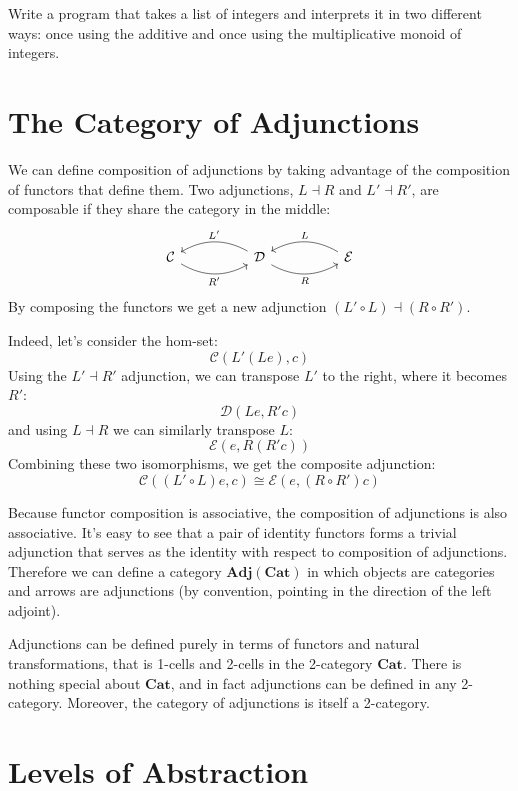 \documentclass[DaoFP]{subfiles}
\begin{document}
\begin{exercise}
Write a program that takes a list of integers and interprets it in two different ways: once using the additive and once using the multiplicative monoid of integers.
\end{exercise}

\section{The Category of Adjunctions}
We can define composition of adjunctions by taking advantage of the composition of functors that define them. Two adjunctions, $L \dashv R$ and $L' \dashv R'$, are composable if they share the category in the middle:
\[
 \begin{tikzcd}
  \mathcal{C}
  \arrow[rr, bend right, "R'"']
  &&
  \mathcal{D}
  \arrow[ll, bend right, "L'"']
    \arrow[rr, bend right, "R"']
&&
  \mathcal{E}
  \arrow[ll, bend right, "L"']
 \end{tikzcd}
\]
By composing the functors we get a new adjunction $(L' \circ L) \dashv (R \circ R')$. 

Indeed, let's consider the hom-set:
\[ \mathcal{C}(L' (L e), c) \]
Using the $L' \dashv R'$ adjunction, we can transpose $L'$ to the right, where it becomes $R'$:
\[ \mathcal{D}(L e, R' c) \]
and using $L \dashv R$ we can similarly transpose $L$:
\[ \mathcal{E}( e, R(R' c)) \]
Combining these two isomorphisms, we get the composite adjunction:
\[ \mathcal{C}((L' \circ L) e, c) \cong \mathcal{E}( e, (R \circ R') c)\]

Because functor composition is associative, the composition of adjunctions is also associative. It's easy to see that a pair of identity functors forms a trivial adjunction that serves as the identity with respect to composition of adjunctions. Therefore we can define a category $\mathbf{Adj}(\mathbf{Cat})$ in which objects are categories and arrows are adjunctions (by convention, pointing in the direction of the left adjoint). 

Adjunctions can be defined purely in terms of functors and natural transformations, that is 1-cells and 2-cells in the 2-category $\mathbf{Cat}$. There is nothing special about $\mathbf{Cat}$, and in fact adjunctions can be defined in any 2-category. Moreover, the category of adjunctions is itself a 2-category.

\section{Levels of Abstraction}
\end{document}
